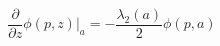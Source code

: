 \begin{equation}
\frac {\partial} {\partial z} \phi(p,z)\Big|_{a}=-\frac {\lambda_2(a)} 2 \phi(p,a)
\label{bca2}
\end{equation}

